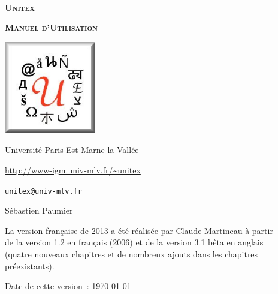 
\begin{titlepage}
\begin{center}

~

\vspace{3cm}
\Huge
\textsc{\textbf{Unitex \UnitexVersion{}}}

\vspace{1cm}

\huge
\textsc{\textbf{Manuel d'Utilisation}}

\vspace{2cm}

  \begin{center}
    \includegraphics[width=4cm]{resources/img/logo-Unitex.png}
  \end{center}
\normalsize

\vspace{2cm}

\LARGE

Université Paris-Est Marne-la-Vallée
\bigskip
\normalsize

\url{http://www-igm.univ-mlv.fr/~unitex}

\verb$unitex@univ-mlv.fr$

\vspace{1cm}

Sébastien Paumier
\bigskip

La version française de 2013 a été réalisée par Claude Martineau à partir\\
de la version 1.2 en français (2006) et de la version 3.1 bêta en anglais \\
(quatre nouveaux chapitres et de nombreux ajouts dans les chapitres préexistants).
\bigskip

\mydate
Date de cette version~: \today

\end{center}

\end{titlepage}

